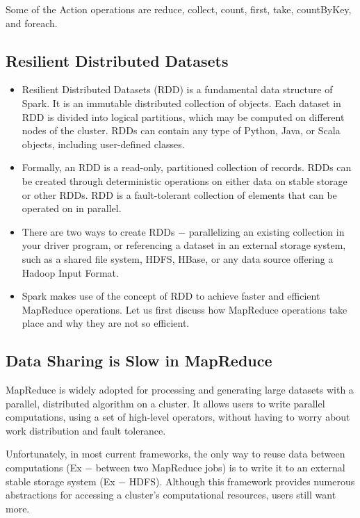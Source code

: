 \documentclass[a4paper,12pt]{article}
\begin{document}
Some of the Action operations are reduce, collect, count, first, take, countByKey, and foreach.


\subsection*{Resilient Distributed Datasets}
\begin{itemize}
\item Resilient Distributed Datasets (RDD) is a fundamental data structure of Spark. It is an immutable distributed collection of objects. Each dataset in RDD is divided into logical partitions, which may be computed on different nodes of the cluster. RDDs can contain any type of Python, Java, or Scala objects, including user-defined classes.

\item Formally, an RDD is a read-only, partitioned collection of records. RDDs can be created through deterministic operations on either data on stable storage or other RDDs. RDD is a fault-tolerant collection of elements that can be operated on in parallel.

\item There are two ways to create RDDs − parallelizing an existing collection in your driver program, or referencing a dataset in an external storage system, such as a shared file system, HDFS, HBase, or any data source offering a Hadoop Input Format.

\item Spark makes use of the concept of RDD to achieve faster and efficient MapReduce operations. Let us first discuss how MapReduce operations take place and why they are not so efficient.
\end{itemize}

\subsection*{Data Sharing is Slow in MapReduce}
MapReduce is widely adopted for processing and generating large datasets with a parallel, distributed algorithm on a cluster. It allows users to write parallel computations, using a set of high-level operators, without having to worry about work distribution and fault tolerance.

Unfortunately, in most current frameworks, the only way to reuse data between computations (Ex − between two MapReduce jobs) is to write it to an external stable storage system (Ex − HDFS). Although this framework provides numerous abstractions for accessing a cluster’s computational resources, users still want more.
\end{document}
